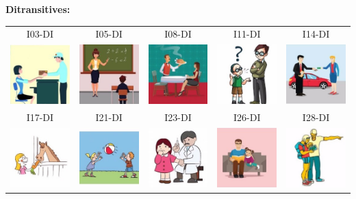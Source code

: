 \documentclass[12pt,notitlepage]{article}
\begin{document}
\begin{center}
\textbf{Ditransitives:}

\begin{tabular}{|c||c||c||c||c|}
\hline
I03-DI & I05-DI & I08-DI & I11-DI & I14-DI \\
\includegraphics[width=0.13\columnwidth]{square/I03.jpg} &  \includegraphics[width=0.13\columnwidth]{square/I05.jpg} &  \includegraphics[width=0.13\columnwidth]{square/I08.jpg} & \includegraphics[width=0.13\columnwidth]{square/I11.jpg} & \includegraphics[width=0.13\columnwidth]{square/I14.jpg} \\
\hline
\hline
I17-DI & I21-DI & I23-DI & I26-DI & I28-DI \\
\includegraphics[width=0.13\columnwidth]{square/I17.jpg} &  \includegraphics[width=0.13\columnwidth]{square/I21.jpg} & \includegraphics[width=0.13\columnwidth]{square/I23.jpg} & \includegraphics[width=0.13\columnwidth]{square/I26.jpg} &  \includegraphics[width=0.13\columnwidth]{square/I28.jpg} \\

\end{tabular}
\end{center}
\end{document}
